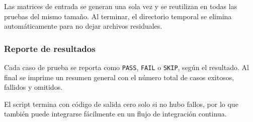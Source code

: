 Las matrices de entrada se generan una sola vez y se reutilizan en todas las pruebas del mismo tamaño. Al terminar, el directorio temporal se elimina automáticamente para no dejar archivos residuales.

\subsubsection{Reporte de resultados}

Cada caso de prueba se reporta como \texttt{PASS}, \texttt{FAIL} o \texttt{SKIP}, según el resultado. Al final se imprime un resumen general con el número total de casos exitosos, fallidos y omitidos.

El script termina con código de salida cero solo si no hubo fallos, por lo que también puede integrarse fácilmente en un flujo de integración continua.